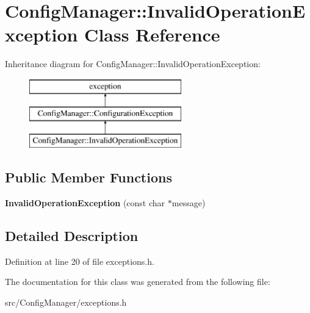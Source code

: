 \hypertarget{class_config_manager_1_1_invalid_operation_exception}{}\section{Config\+Manager\+:\+:Invalid\+Operation\+Exception Class Reference}
\label{class_config_manager_1_1_invalid_operation_exception}
Inheritance diagram for Config\+Manager\+:\+:Invalid\+Operation\+Exception\+:\begin{figure}[H]
\begin{center}
\leavevmode
\includegraphics[height=3.000000cm]{class_config_manager_1_1_invalid_operation_exception}
\end{center}
\end{figure}
\subsection*{Public Member Functions}
\begin{DoxyCompactItemize}
\item 
{\bfseries Invalid\+Operation\+Exception} (const char $\ast$message)\hypertarget{class_config_manager_1_1_invalid_operation_exception_aee04fbcabd25794c25f1d245fd9d5f29}{}\label{class_config_manager_1_1_invalid_operation_exception_aee04fbcabd25794c25f1d245fd9d5f29}

\end{DoxyCompactItemize}


\subsection{Detailed Description}


Definition at line 20 of file exceptions.\+h.



The documentation for this class was generated from the following file\+:\begin{DoxyCompactItemize}
\item 
src/\+Config\+Manager/exceptions.\+h\end{DoxyCompactItemize}
